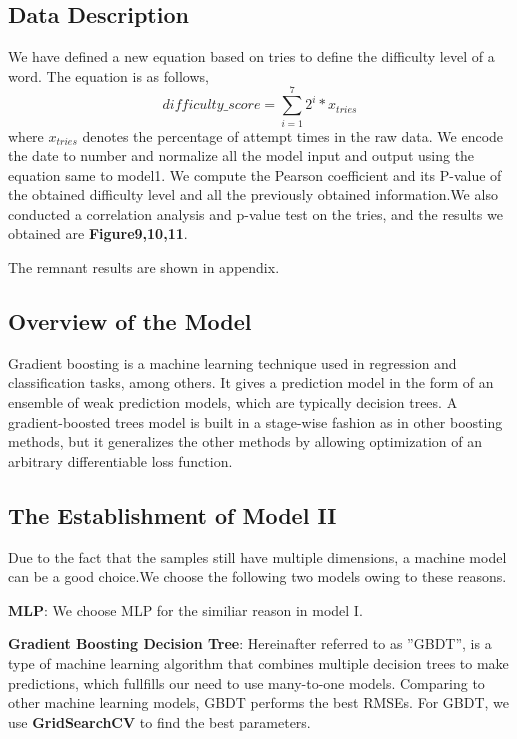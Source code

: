 \documentclass[12pt]{article}
\begin{document}
\subsection{Data Description}
We have defined a new equation based on tries to define the difficulty level of a word. The equation is as follows,
\begin{equation*}
	difficulty\_score = \sum_{i=1}^{7}2^{i}*x_{tries}
\end{equation*}
where $x_{tries}$ denotes the percentage of attempt times in the raw data. 
We encode the date to number and normalize all the model input and output using the equation same to model1.
We compute the Pearson coefficient and its P-value of the obtained difficulty level and all the previously obtained information.We also conducted a correlation analysis and p-value test on the tries, and the results we obtained are \textbf{Figure9,10,11}.

The remnant results are shown in appendix.

\subsection{Overview of the Model}
Gradient boosting is a machine learning technique used in regression and classification tasks, among others. It gives a prediction model in the form of an ensemble of weak prediction models, which are typically decision trees. A gradient-boosted trees model is built in a stage-wise fashion as in other boosting methods, but it generalizes the other methods by allowing optimization of an arbitrary differentiable loss function.
\subsection{The Establishment of Model II}
Due to the fact that the samples still have multiple dimensions, a machine model can be a good choice.We choose the following two models owing to these reasons.

\textbf{MLP}: We choose MLP for the similiar reason in model I.

\textbf{Gradient Boosting Decision Tree}: Hereinafter referred to as ”GBDT”, is a type of machine learning algorithm that combines multiple decision trees to make predictions, which fullfills our need to use many-to-one models. Comparing to other machine learning models, GBDT performs the best RMSEs. For GBDT, we use \textbf{GridSearchCV} to find the best parameters.
\end{document}
